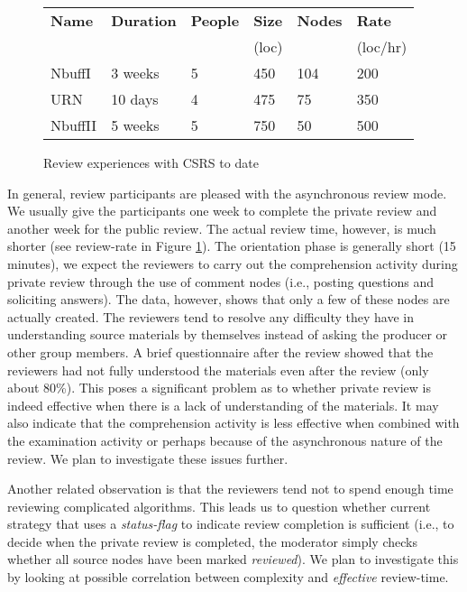 \small
\begin{figure}[tb]
  \begin{center}
    \begin{tabular} {|l|l|l|l|l|l|} 
      \hline
      {\bf Name} & {\bf Duration} & {\bf People} & 
      {\bf Size} & {\bf Nodes} & {\bf Rate} \\
        & & & (loc) & & (loc/hr) \\
      \hline
      NbuffI & 3 weeks & 5 & 450 & 104 & 200 \\
      URN & 10 days & 4 & 475 & 75 & 350 \\
      NbuffII & 5 weeks & 5 & 750 & 50 & 500 \\
      \hline
    \end{tabular}
  \end{center}
  \caption{Review experiences with CSRS to date}
  \label{fig:review-experiences}
\end{figure}
\normalsize

In general, review participants are pleased with the asynchronous
review mode.  We usually give the participants one week to complete
the private review and another week for the public review. The actual
review time, however, is much shorter (see review-rate in Figure
\ref{fig:review-experiences}).  The orientation phase is generally
short (15 minutes), we expect the reviewers to carry out the
comprehension activity during private review through the use of
comment nodes (i.e., posting questions and soliciting answers).  The
data, however, shows that only a few of these nodes are actually
created. The reviewers tend to resolve any difficulty they have in
understanding source materials by themselves instead of asking the
producer or other group members.  A brief questionnaire after the
review showed that the reviewers had not fully understood the
materials even after the review (only about 80\%).  This poses a
significant problem as to whether private review is indeed effective
when there is a lack of understanding of the materials.  It may also
indicate that the comprehension activity is less effective when
combined with the examination activity or perhaps because of the
asynchronous nature of the review. We plan to investigate these issues
further.

Another related observation is that the reviewers tend not to spend
enough time reviewing complicated algorithms.  This leads us to
question whether current strategy that uses a {\it status-flag} to
indicate review completion is sufficient (i.e., to decide when the
private review is completed, the moderator simply checks whether all
source nodes have been marked {\it reviewed}).  We plan to investigate
this by looking at possible correlation between complexity and {\it
effective} review-time.

